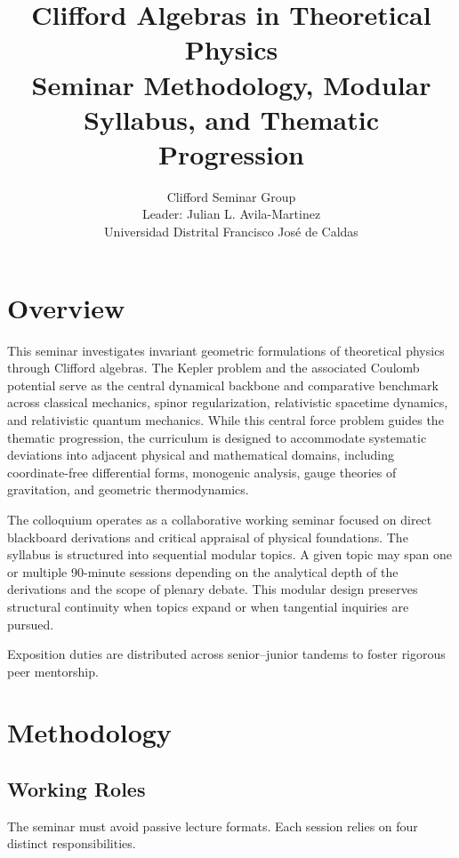 \documentclass[11pt,a4paper]{article}
\title{\LARGE\bfseries Clifford Algebras in Theoretical Physics\\[0.5em]
\large Seminar Methodology, Modular Syllabus, and Thematic Progression}
\author{Clifford Seminar Group\\
  \small Leader: Julian L. Avila-Martinez \\
  \small Universidad Distrital Francisco Jos{\'e} de Caldas}
\date{}
\begin{document}
\maketitle

\section{Overview}
\label{sec:overview}

This seminar investigates invariant geometric formulations of theoretical
physics through Clifford algebras.
The Kepler problem and the associated Coulomb potential serve as the central
dynamical backbone and comparative benchmark across classical mechanics, spinor
regularization, relativistic spacetime dynamics, and relativistic quantum
mechanics.
While this central force problem guides the thematic progression, the curriculum
is designed to accommodate systematic deviations into adjacent physical and
mathematical domains, including coordinate-free differential forms, monogenic
analysis, gauge theories of gravitation, and geometric thermodynamics.

The colloquium operates as a collaborative working seminar focused on direct
blackboard derivations and critical appraisal of physical foundations.
The syllabus is structured into sequential modular topics.
A given topic may span one or multiple 90-minute sessions depending on the
analytical depth of the derivations and the scope of plenary debate.
This modular design preserves structural continuity when topics expand or when
tangential inquiries are pursued.

Exposition duties are distributed across senior--junior tandems to foster
rigorous peer mentorship.

\section{Methodology}
\label{sec:methodology}

\subsection{Working Roles}
\label{subsec:roles}

The seminar must avoid passive lecture formats.
Each session relies on four distinct responsibilities.
\end{document}
